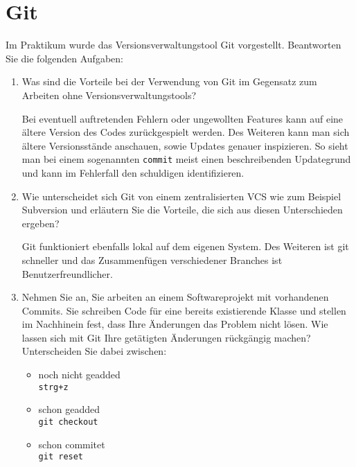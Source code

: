 \documentclass{article}
\newcommand{\gqq}[1]{\glqq{}#1\grqq{}}
\begin{document}
    \newpage
    \section{Git}
    Im Praktikum wurde das Versionsverwaltungstool Git vorgestellt.
    Beantworten Sie die folgenden Aufgaben:
    \begin{enumerate}[label=\alph*.]
        \item Was sind die Vorteile bei der Verwendung von Git im Gegensatz zum Arbeiten ohne Versionsverwaltungstools?
            
            Bei eventuell auftretenden Fehlern oder ungewollten \gqq{Features} kann auf eine ältere Version des Codes zurückgespielt werden.
            Des Weiteren kann man sich ältere Versionsstände anschauen, sowie Updates genauer inspizieren.
            So sieht man bei einem sogenannten \texttt{commit} meist einen beschreibenden Updategrund und kann im Fehlerfall den schuldigen identifizieren.
        \item Wie unterscheidet sich Git von einem zentralisierten VCS wie zum Beispiel Subversion und erläutern Sie die Vorteile, die sich aus diesen Unterschieden ergeben?

            Git funktioniert ebenfalls lokal auf dem eigenen System.
            Des Weiteren ist git schneller und das Zusammenfügen verschiedener Branches ist Benutzerfreundlicher.
        \item Nehmen Sie an, Sie arbeiten an einem Softwareprojekt mit vorhandenen Commits. Sie schreiben Code für eine bereits existierende Klasse und stellen im Nachhinein fest, dass Ihre Änderungen das Problem nicht lösen.
            Wie lassen sich mit Git Ihre getätigten Änderungen rückgängig machen? Unterscheiden Sie dabei zwischen:
            \begin{itemize}[label=◦]
                \item noch nicht geadded\\
                    \texttt{strg+z}
                \item schon geadded\\
                    \texttt{git checkout}
                \item schon commitet\\
                    \texttt{git reset}
            \end{itemize}
    \end{enumerate}
\end{document}
